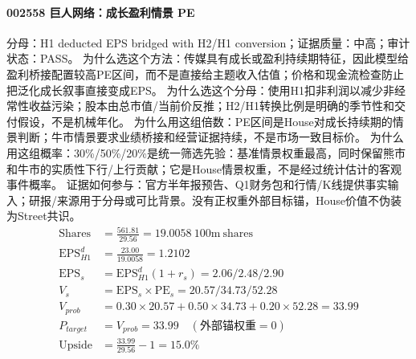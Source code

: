 \paragraph{002558 巨人网络：成长盈利情景 PE}
分母：H1 deducted EPS bridged with H2/H1 conversion；证据质量：中高；审计状态：PASS。
为什么选这个方法：传媒具有成长或盈利持续期特征，因此模型给盈利桥接配置较高PE区间，而不是直接给主题收入估值；价格和现金流检查防止把泛化成长叙事直接变成EPS。
为什么选这个分母：使用H1扣非利润以减少非经常性收益污染；股本由总市值/当前价反推；H2/H1转换比例是明确的季节性和交付假设，不是机械年化。
为什么用这组倍数：PE区间是House对成长持续期的情景判断；牛市情景要求业绩桥接和经营证据持续，不是市场一致目标价。
为什么用这组概率：30\%/50\%/20\%是统一筛选先验：基准情景权重最高，同时保留熊市和牛市的实质性下行/上行贡献；它是House情景权重，不是经过统计估计的客观事件概率。
证据如何参与：官方半年报预告、Q1财务包和行情/K线提供事实输入；研报/来源用于分母或可比背景。没有正权重外部目标锚，House价值不伪装为Street共识。
\begin{align*}
\mathrm{Shares} &= \frac{561.81}{29.56}=19.0058\ \mathrm{100m\ shares}\\
\mathrm{EPS}_{H1}^d &= \frac{23.00}{19.0058}=1.2102\\
\mathrm{EPS}_s &= \mathrm{EPS}_{H1}^d(1+r_s)=2.06/2.48/2.90\\
V_s &= \mathrm{EPS}_s\times \mathrm{PE}_s=20.57/34.73/52.28\\
V_{prob} &= 0.30\times 20.57+0.50\times 34.73+0.20\times 52.28=33.99\\
P_{target} &= V_{prob}=33.99\quad(\text{外部锚权重}=0)\\
\mathrm{Upside} &= \frac{33.99}{29.56}-1=15.0\%\\
\end{align*}

